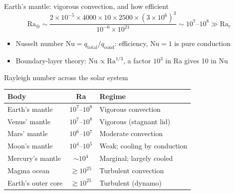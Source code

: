 \documentclass[aspectratio=169, 11pt]{beamer}
\begin{document}
\begin{frame}{Earth's mantle: vigorous convection, and how efficient}
  $$\mathrm{Ra}_\oplus \sim \frac{2 \times 10^{-5} \times 4000 \times 10 \times 2500 \times (3 \times 10^6)^3}{10^{-6} \times 10^{21}} \sim 10^7\text{--}10^8 \gg \mathrm{Ra}_c$$
  \vskip4pt
  \begin{itemize}\setlength\itemsep{2pt}
    \item Nusselt number $\mathrm{Nu} = q_{\mathrm{total}}/q_{\mathrm{cond}}$: efficiency, $\mathrm{Nu} = 1$ is pure conduction
    \item Boundary-layer theory: $\mathrm{Nu} \propto \mathrm{Ra}^{1/3}$, a factor $10^3$ in Ra gives 10 in Nu
  \end{itemize}
  \vskip4pt
\end{frame}

\begin{frame}{Rayleigh number across the solar system}
  \centering
  \small
  \begin{tabular}{l c l}
    \toprule
    \textbf{Body} & \textbf{Ra} & \textbf{Regime} \\
    \midrule
    Earth's mantle      & $10^7$--$10^8$ & Vigorous convection \\
    Venus' mantle       & $10^7$--$10^8$ & Vigorous (stagnant lid) \\
    Mars' mantle        & $10^6$--$10^7$ & Moderate convection \\
    Moon's mantle       & $10^4$--$10^5$ & Weak; cooling by conduction \\
    Mercury's mantle    & $\sim$$10^4$    & Marginal; largely cooled \\
    Magma ocean         & $\gtrsim 10^{25}$ & Turbulent convection \\
    Earth's outer core  & $\gtrsim 10^{25}$ & Turbulent (dynamo) \\
    \bottomrule
  \end{tabular}
  \vskip8pt
\end{frame}

\begin{frame}
\end{frame}
\end{document}
